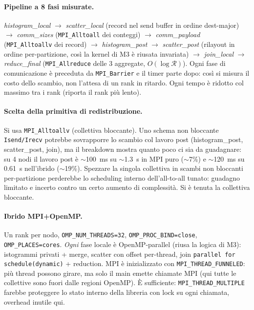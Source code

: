 \documentclass[11pt,a4paper]{article}
\theoremstyle{remark}
\begin{document}
\paragraph{Pipeline a 8 fasi misurate.} \emph{histogram\_local} $\to$ \emph{scatter\_local} (record nel send buffer in ordine dest-major) $\to$ \emph{comm\_sizes} (\texttt{MPI\_Alltoall} dei conteggi) $\to$ \emph{comm\_payload} (\texttt{MPI\_Alltoallv} dei record) $\to$ \emph{histogram\_post} $\to$ \emph{scatter\_post} (rilayout in ordine per-partizione, cos\`i la kernel di M3 \`e riusata invariata) $\to$ \emph{join\_local} $\to$ \emph{reduce\_final} (\texttt{MPI\_Allreduce} delle 3 aggregate, $O(\log\mathcal{R})$). Ogni fase di comunicazione \`e preceduta da \texttt{MPI\_Barrier} e il timer parte dopo: cos\`i si misura il costo dello scambio, non l'attesa di un rank in ritardo. Ogni tempo \`e ridotto col massimo tra i rank (riporta il rank pi\`u lento).

\paragraph{Scelta della primitiva di redistribuzione.} Si usa \texttt{MPI\_Alltoallv} (collettiva bloccante). Uno schema non bloccante \texttt{Isend/Irecv} potrebbe sovrapporre lo scambio col lavoro post (histogram\_post, scatter\_post, join), ma il breakdown mostra quanto poco ci sia da guadagnare: su 4 nodi il lavoro post \`e $\sim$100~ms su $\sim$1.3~s in MPI puro ($\sim$7\%) e $\sim$120~ms su 0.61~s nell'ibrido ($\sim$19\%). Spezzare la singola collettiva in scambi non bloccanti per-partizione perderebbe lo scheduling interno dell'all-to-all tunato: guadagno limitato e incerto contro un certo aumento di complessit\`a. Si \`e tenuta la collettiva bloccante.

\paragraph{Ibrido MPI+OpenMP.} Un rank per nodo, \texttt{OMP\_NUM\_THREADS=32}, \texttt{OMP\_PROC\_BIND=close}, \texttt{OMP\_PLACES=cores}. \emph{Ogni} fase locale \`e OpenMP-parallel (riusa la logica di M3): istogrammi privati + merge, scatter con offset per-thread, join \texttt{parallel for schedule(dynamic)} + reduction. MPI \`e inizializzato con \texttt{MPI\_THREAD\_FUNNELED}: pi\`u thread possono girare, ma solo il main emette chiamate MPI (qui tutte le collettive sono fuori dalle regioni OpenMP). \`E sufficiente: \texttt{MPI\_THREAD\_MULTIPLE} farebbe proteggere lo stato interno della libreria con lock su ogni chiamata, overhead inutile qui.
\end{document}
